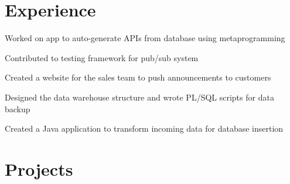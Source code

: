 \documentclass[letterpaper]{deedy-resume} %
\begin{document}
\begin{minipage}[t]{0.66\textwidth} %


\section{Experience}


\vspace{\topsep} %
\begin{tightitemize}
\item Worked on app to auto-generate APIs from database using metaprogramming
\item Contributed to testing framework for pub/sub system
\end{tightitemize}

\sectionspace %



\begin{tightitemize}
\item Created a website for the sales team to push announcements to customers
\item Designed the data warehouse structure and wrote PL/SQL scripts for data backup
\item Created a Java application to transform incoming data for database insertion
\end{tightitemize}

\sectionspace %


\section{Projects}



\end{minipage}
\end{document}
